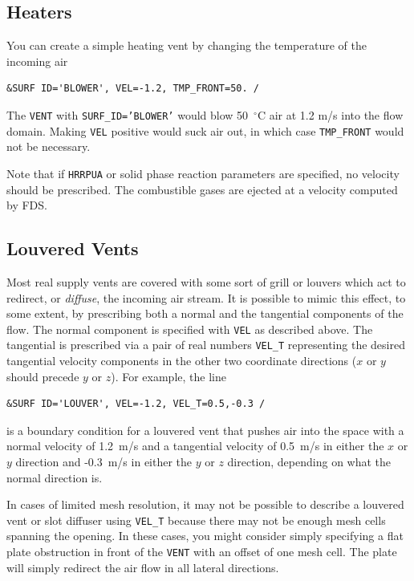 \documentclass[11pt]{book}
\newcommand{\ct}{\tt\small}
\begin{document}
\subsection{Heaters}

You can create a simple heating vent by changing the temperature of the incoming air

\footnotesize
\begin{verbatim}
&SURF ID='BLOWER', VEL=-1.2, TMP_FRONT=50. /
\end{verbatim}
\normalsize

\noindent
The {\ct VENT} with {\ct SURF\_ID='BLOWER'} would blow 50~$^\circ$C
air at 1.2 m/s into the flow domain. Making {\ct VEL} positive would
suck air out, in which case {\ct TMP\_FRONT} would not be necessary.

Note that if {\ct HRRPUA} or solid phase reaction parameters are
specified, no velocity should be prescribed. The combustible gases
are ejected at a velocity computed by FDS.



\subsection{Louvered Vents}

\label{info:louvers}

Most real supply vents are covered with some sort of grill or louvers which act to redirect, or {\em diffuse}, the
incoming air stream.
It is possible to mimic this effect, to some extent, by prescribing both a normal and the tangential components of the flow.
The normal component is specified with {\ct VEL} as described above. The tangential is prescribed
via a pair of real numbers {\ct VEL\_T} representing the desired tangential
velocity components in the other two coordinate directions ($x$ or $y$ should precede $y$ or $z$). For example, the line

\footnotesize
\begin{verbatim}
&SURF ID='LOUVER', VEL=-1.2, VEL_T=0.5,-0.3 /
\end{verbatim}
\normalsize

\noindent
is a boundary condition for a louvered vent that pushes air into the
space with a normal velocity of 1.2~m/s and a tangential velocity
of 0.5~m/s in either the $x$ or $y$ direction and -0.3~m/s in either
the $y$ or $z$ direction, depending on what the normal direction is.

In cases of limited mesh resolution, it may not be possible to describe a louvered vent or
slot diffuser using {\ct VEL\_T} because there may not be enough mesh cells spanning the
opening. In these cases, you might consider simply specifying a flat plate obstruction in front of the
{\ct VENT} with an offset of one mesh cell. The plate will simply redirect the air flow in all lateral
directions.
\end{document}
